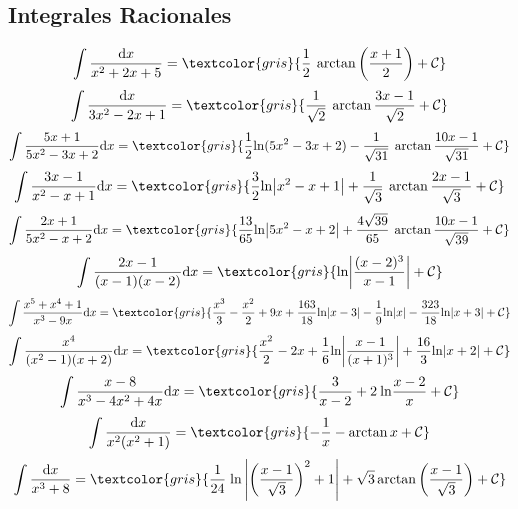 {\begin{fleqn}
	\subsection*{Integrales Racionales}
	
	\begin{equation}
		\int \frac{\mathrm{d}x}{x^2+2x+5}=\textcolor{gris}{\frac 1 2 \: \arctan \left( \frac{x+1}{2}\right) +\mathcal C}
	\end{equation}
	\begin{equation}
		\int \frac{\mathrm{d}x}{3x^2-2x+1}=\textcolor{gris}{\frac{1}{\sqrt{2}}\: \arctan\frac{3x-1}{\sqrt{2}}+\mathcal C}
	\end{equation}
	\begin{equation}
		\int \frac{5x+1}{5x^2-3x+2}\mathrm{d}x=\textcolor{gris}{\frac{1}{2}\mathrm{ln}(5x^2-3x+2)-\frac{1}{\sqrt{31}}\: \arctan\frac{10x-1}{\sqrt{31}}+\mathcal C}
	\end{equation}
	\begin{equation}
		\int \frac{3x-1}{x^2-x+1}\mathrm{d}x=\textcolor{gris}{\frac{3
	}{2}\mathrm{ln} \abs{x^2-x+1}+\frac{1}{\sqrt{3}}\: \arctan\frac{2x-1}{\sqrt{3}}+\mathcal C}
	\end{equation}
	\begin{equation}
		\int \frac{2x+1}{5x^2-x+2}\mathrm{d}x=\textcolor{gris}{\frac{13}{65}\mathrm{ln} \abs {5x^2-x+2}+ \frac {4\sqrt{39}}{65}\: \arctan \frac{10x-1}{\sqrt{39}}+\mathcal C}
	\end{equation}
	\begin{equation}
		\int \frac{2x-1}{(x-1)(x-2)} \mathrm{d}x=\textcolor{gris}{\mathrm{ln} \abs {\frac{(x-2)^3}{x-1}}+\mathcal C}
	\end{equation}
	\begin{equation}
		\int\frac{x^5+x^4+1}{x^3-9x}\mathrm{d}x=\textcolor{gris}{\dfrac {x^3}{3} -\dfrac {x^2}{2} +9x+ \frac {163}{18}\mathrm{ln}|x-3|-\frac 1 9 \mathrm{ln}|x|- \frac {323}{18}\mathrm {ln}|x+3|+\mathcal C}
	\end{equation}
	\begin{equation}
		\int \frac{x^4}{(x^2-1)(x+2)}\mathrm{d}x=\textcolor{gris}{\frac{x^2}{2}-2x+\frac{1}{6}\mathrm{ln} \abs{\frac{x-1}{(x+1)^3}}+\frac {16}{3}\mathrm{ln} \abs{x+2}+\mathcal C}
	\end{equation}
	\begin{equation}
		\int \frac{x-8}{x^3-4x^2+4x}\mathrm{d}x=\textcolor{gris}{\frac{3}{x-2}+2\:\mathrm{ln} \frac{x-2}{x}+\mathcal C}
	\end{equation}
	\begin{equation}
		\int \frac{\mathrm{d}x}{x^2(x^2+1)}=\textcolor{gris}{-\frac 1 x - \arctan x +\mathcal C}
	\end{equation}
	\begin{equation}
		\displaystyle \int \frac{\mathrm{d}x}{x^3+8}=\textcolor{gris}{\frac {1}{24} \; \mathrm{ln} \left| { \left( \dfrac {x-1}{\sqrt{3}}  \right)^2 +1 }  \right|+ \sqrt{3}\arctan \left( \dfrac {x-1}{\sqrt{3}}  \right) +\mathcal C}
	\end{equation}
	

\end{fleqn}}
